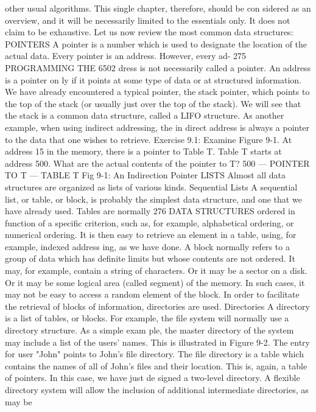{other usual algorithms. This single chapter, therefore, should be con
sidered as an overview, and it will be necessarily limited to the essentials
only. It does not claim to be exhaustive.
Let us now review the most common data structures:
POINTERS
A pointer is a number which is used to designate the location of
the actual data. Every pointer is an address. However, every ad-
275
PROGRAMMING THE 6502
dress is not necessarily called a pointer. An address is a pointer on
ly if it points at some type of data or at structured information. We
have already encountered a typical pointer, the stack pointer,
which points to the top of the stack (or usually just over the top of
the stack). We will see that the stack is a common data structure,
called a LIFO structure.
As another example, when using indirect addressing, the in
direct address is always a pointer to the data that one wishes to
retrieve.
Exercise 9.1: Examine Figure 9-1. At address 15 in the memory,
there is a pointer to Table T. Table T starts at address 500. What
are the actual contents of the pointer to T?
500
— POINTER TO T —
TABLE T
Fig 9-1: An Indirection Pointer
LISTS
Almost all data structures are organized as lists of various
kinds.
Sequential Lists
A sequential list, or table, or block, is probably the simplest data
structure, and one that we have already used. Tables are normally
276
DATA STRUCTURES
ordered in function of a specific criterion, such as, for example,
alphabetical ordering, or numerical ordering. It is then easy to
retrieve an element in a table, using, for example, indexed address
ing, as we have done. A block normally refers to a group of data
which has definite limits but whose contents are not ordered. It
may, for example, contain a string of characters. Or it may be a
sector on a disk. Or it may be some logical area (called segment) of
the memory. In such cases, it may not be easy to access a random
element of the block.
In order to facilitate the retrieval of blocks of information, directories
are used.
Directories
A directory is a list of tables, or blocks. For example, the file
system will normally use a directory structure. As a simple exam
ple, the master directory of the system may include a list of the
users' names. This is illustrated in Figure 9-2. The entry for user
"John" points to John's file directory. The file directory is a table
which contains the names of all of John's files and their location.
This is, again, a table of pointers. In this case, we have just de
signed a two-level directory. A flexible directory system will allow
the inclusion of additional intermediate directories, as may be
}
